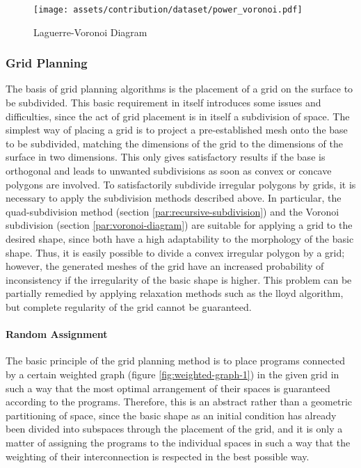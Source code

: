 \documentclass[a4paper, 12pt]{report}
\begin{document}
\begin{figure}
\centering
\texttt{[image: assets/contribution/dataset/power\_voronoi.pdf]}
\caption{Laguerre-Voronoi Diagram}
\label{fig:weighted-laguerre-voronoi-diagram}
\end{figure}

\subsubsection{Grid Planning}\label{subsubsec:grid-planning}

The basis of grid planning algorithms is the placement of a grid on the surface to be subdivided. This basic requirement in itself introduces some issues and difficulties, since the act of grid placement is in itself a subdivision of space. The simplest way of placing a grid is to project a pre-established mesh onto the base to be subdivided, matching the dimensions of the grid to the dimensions of the surface in two dimensions. This only gives satisfactory results if the base is orthogonal and leads to unwanted subdivisions as soon as \gls{convex} or concave polygons are involved. To satisfactorily subdivide irregular polygons by grids, it is necessary to apply the subdivision methods described above. In particular, the quad-subdivision method (section \ref{par:recursive-subdivision}) and the Voronoi subdivision (section \ref{par:voronoi-diagram}) are suitable for applying a grid to the desired shape, since both have a high adaptability to the morphology of the basic shape. Thus, it is easily possible to divide a \gls{convex} irregular polygon by a grid; however, the generated meshes of the grid have an increased probability of inconsistency if the irregularity of the basic shape is higher. This problem can be partially remedied by applying relaxation methods such as the \Gls{lloyd algorithm}, but complete regularity of the grid cannot be guaranteed.

\paragraph{Random Assignment}\label{par:random-assignment}

The basic principle of the grid planning method is to place programs connected by a certain weighted graph (figure \ref{fig:weighted-graph-1}) in the given grid in such a way that the most optimal arrangement of their spaces is guaranteed according to the programs. Therefore, this is an abstract rather than a geometric partitioning of space, since the basic shape as an initial condition has already been divided into subspaces through the placement of the grid, and it is only a matter of assigning the programs to the individual spaces in such a way that the weighting of their interconnection is respected in the best possible way.
\end{document}
